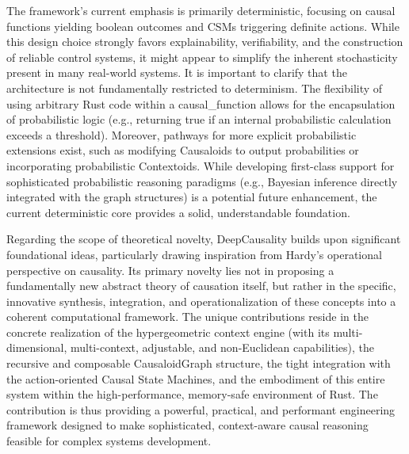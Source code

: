 The framework's current emphasis is primarily deterministic, focusing on causal functions yielding boolean outcomes and CSMs triggering definite actions. While this design choice strongly favors explainability, verifiability, and the construction of reliable control systems, it might appear to simplify the inherent stochasticity present in many real-world systems. It is important to clarify that the architecture is not fundamentally restricted to determinism. The flexibility of using arbitrary Rust code within a causal\_function allows for the encapsulation of probabilistic logic (e.g., returning true if an internal probabilistic calculation exceeds a threshold). Moreover, pathways for more explicit probabilistic extensions exist, such as modifying Causaloids to output probabilities or incorporating probabilistic Contextoids. While developing first-class support for sophisticated probabilistic reasoning paradigms (e.g., Bayesian inference directly integrated with the graph structures) is a potential future enhancement, the current deterministic core provides a solid, understandable foundation.

Regarding the scope of theoretical novelty, DeepCausality builds upon significant foundational ideas, particularly drawing inspiration from Hardy's operational perspective on causality. Its primary novelty lies not in proposing a fundamentally new abstract theory of causation itself, but rather in the specific, innovative synthesis, integration, and operationalization of these concepts into a coherent computational framework. The unique contributions reside in the concrete realization of the hypergeometric context engine (with its multi-dimensional, multi-context, adjustable, and non-Euclidean capabilities), the recursive and composable CausaloidGraph structure, the tight integration with the action-oriented Causal State Machines, and the embodiment of this entire system within the high-performance, memory-safe environment of Rust. The contribution is thus providing a powerful, practical, and performant engineering framework designed to make sophisticated, context-aware causal reasoning feasible for complex systems development.

